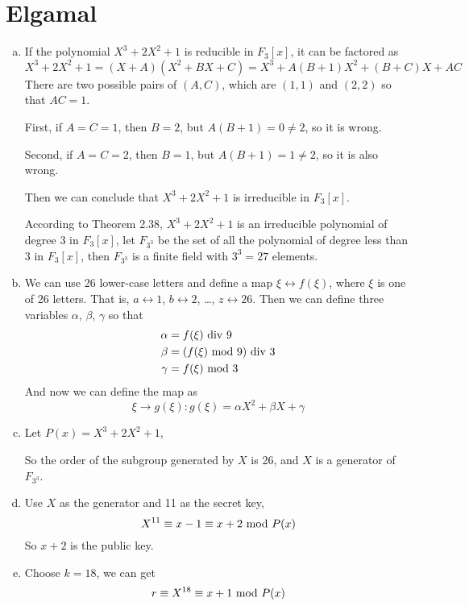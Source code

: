 \documentclass{article}
\renewcommand{\mod}{{\rm\ mod\ }}
\begin{document}
\section{Elgamal}
\begin{enumerate}[(a)]
\item
If the polynomial $X^3+2X^2+1$ is reducible in $F_3[x]$, it can be factored as $$X^3+2X^2+1=(X+A)(X^2+BX+C)=X^3+A(B+1)X^2+(B+C)X+AC$$
There are two possible pairs of $(A,C)$, which are $(1,1)$ and $(2,2)$ so that $AC=1$.

First, if $A=C=1$, then $B=2$, but $A(B+1)=0\neq 2$, so it is wrong.

Second, if $A=C=2$, then $B=1$, but $A(B+1)=1\neq2$, so it is also wrong.

Then we can conclude that $X^3+2X^2+1$ is irreducible in $F_3[x]$.

According to Theorem 2.38, $X^3+2X^2+1$ is an irreducible polynomial of degree 3 in $F_3[x]$, let $F_{3^3}$ be the set of all the polynomial of degree less than 3 in $F_3[x]$, then $F_{3^3}$ is a finite field with $3^3=27$ elements.

\item

We can use 26 lower-case letters and define a map $\xi \leftrightarrow f(\xi)$, where $\xi$ is one of 26 letters. That is, $a \leftrightarrow 1$, $b \leftrightarrow 2$, \dots, $z \leftrightarrow 26$. Then we can define three variables $\alpha$, $\beta$, $\gamma$ so that
\begin{align*}
\alpha &= f(\xi) {\rm\ div\ } 9 \\
\beta  &= (f(\xi) \mod 9) {\rm\ div\ } 3 \\
\gamma &= f(\xi) \mod 3
\end{align*}
And now we can define the map as $$\xi \to g(\xi): g(\xi)=\alpha X^2+\beta X+\gamma$$ 

\item
Let $P(x)=X^3+2X^2+1$,

So the order of the subgroup generated by $X$ is 26, and $X$ is a generator of $F_{3^3}$.

\item
Use $X$ as the generator and 11 as the secret key,
$$X^{11}\equiv x-1 \equiv x+2 \mod P(x)$$
So $x+2$ is the public key.

\item
Choose $k=18$, we can get 
$$r \equiv X^{18} \equiv x+1 \mod P(x)$$



\end{enumerate}
\end{document}
